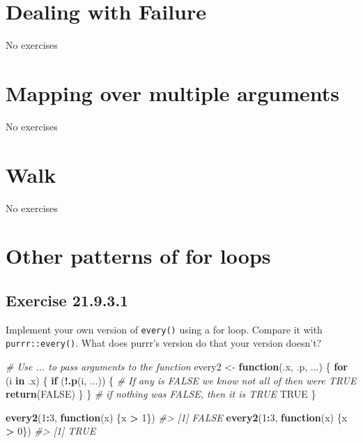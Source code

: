 \documentclass[]{book}
\newenvironment{Shaded}{\begin{snugshade}}{\end{snugshade}}
\newcommand{\CommentTok}[1]{\textcolor[rgb]{0.56,0.35,0.01}{\textit{#1}}}
\newcommand{\ControlFlowTok}[1]{\textcolor[rgb]{0.13,0.29,0.53}{\textbf{#1}}}
\newcommand{\DecValTok}[1]{\textcolor[rgb]{0.00,0.00,0.81}{#1}}
\newcommand{\KeywordTok}[1]{\textcolor[rgb]{0.13,0.29,0.53}{\textbf{#1}}}
\newcommand{\NormalTok}[1]{#1}
\newcommand{\OperatorTok}[1]{\textcolor[rgb]{0.81,0.36,0.00}{\textbf{#1}}}
\newcommand{\OtherTok}[1]{\textcolor[rgb]{0.56,0.35,0.01}{#1}}
\newcommand{\StringTok}[1]{\textcolor[rgb]{0.31,0.60,0.02}{#1}}
\theoremstyle{plain}
\theoremstyle{remark}
\begin{document}
\hypertarget{dealing-with-failure}{%
\section{Dealing with Failure}\label{dealing-with-failure}}

No exercises

\hypertarget{mapping-over-multiple-arguments}{%
\section{Mapping over multiple
arguments}\label{mapping-over-multiple-arguments}}

No exercises

\hypertarget{walk}{%
\section{Walk}\label{walk}}

No exercises

\hypertarget{other-patterns-of-for-loops}{%
\section{Other patterns of for
loops}\label{other-patterns-of-for-loops}}

\hypertarget{exercise-21.9.3.1}{%
\subsection*{\texorpdfstring{Exercise
{21.9.3.1}}{Exercise 21.9.3.1}}\label{exercise-21.9.3.1}}

Implement your own version of \texttt{every()} using a for loop. Compare
it with \texttt{purrr::every()}. What does purrr's version do that your
version doesn't?

\begin{Shaded}
\begin{Highlighting}[]
\CommentTok{# Use ... to pass arguments to the function}
\NormalTok{every2 <-}\StringTok{ }\ControlFlowTok{function}\NormalTok{(.x, .p, ...) \{}
  \ControlFlowTok{for}\NormalTok{ (i }\ControlFlowTok{in}\NormalTok{ .x) \{}
    \ControlFlowTok{if}\NormalTok{ (}\OperatorTok{!}\KeywordTok{.p}\NormalTok{(i, ...)) \{}
      \CommentTok{# If any is FALSE we know not all of then were TRUE}
      \KeywordTok{return}\NormalTok{(}\OtherTok{FALSE}\NormalTok{)}
\NormalTok{    \}}
\NormalTok{  \}}
  \CommentTok{# if nothing was FALSE, then it is TRUE}
  \OtherTok{TRUE}  
\NormalTok{\}}

\KeywordTok{every2}\NormalTok{(}\DecValTok{1}\OperatorTok{:}\DecValTok{3}\NormalTok{, }\ControlFlowTok{function}\NormalTok{(x) \{x }\OperatorTok{>}\StringTok{ }\DecValTok{1}\NormalTok{\})}
\CommentTok{#> [1] FALSE}
\KeywordTok{every2}\NormalTok{(}\DecValTok{1}\OperatorTok{:}\DecValTok{3}\NormalTok{, }\ControlFlowTok{function}\NormalTok{(x) \{x }\OperatorTok{>}\StringTok{ }\DecValTok{0}\NormalTok{\})}
\CommentTok{#> [1] TRUE}
\end{Highlighting}
\end{Shaded}
\end{document}
